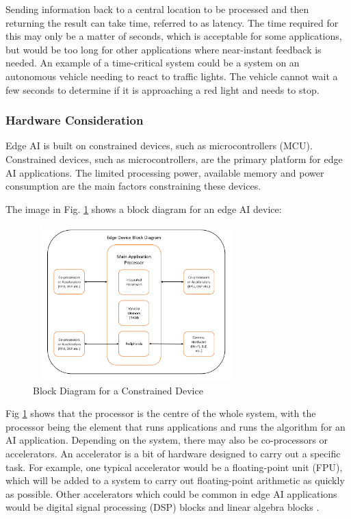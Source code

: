\documentclass[conference]{IEEEtran}
\begin{document}
Sending information back to a central location to be processed and then returning the result can take time, referred to as latency. The time required for this may only be a matter of seconds, which is acceptable for some applications, but would be too long for other applications where near-instant feedback is needed. An example of a time-critical system could be a system on an autonomous vehicle needing to react to traffic lights. The vehicle cannot wait a few seconds to determine if it is approaching a red light and needs to stop. 

\subsubsection{Hardware Consideration}
Edge AI is built on constrained devices, such as microcontrollers (MCU). Constrained devices, such as microcontrollers, are the primary platform for edge AI applications. The limited processing power, available memory and power consumption are the main factors constraining these devices. 

The image in Fig. \ref{fig:ucblock} shows a block diagram for an edge AI device:    
\begin{figure}[h]
\includegraphics[width=8cm, height=6cm]{images/edge_device_block_diagram.png}
\centering
\caption{Block Diagram for a Constrained Device}
\label{fig:ucblock}
\end{figure}

Fig \ref{fig:ucblock} shows that the processor is the centre of the whole system, with the processor being the element that runs applications and runs the algorithm for an AI application. Depending on the system, there may also be co-processors or accelerators. An accelerator is a bit of hardware designed to carry out a specific task. For example, one typical accelerator would be a floating-point unit (FPU), which will be added to a system to carry out floating-point arithmetic as quickly as possible. Other accelerators which could be common in edge AI applications would be digital signal processing (DSP) blocks and linear algebra blocks \cite{edgeAI}. 
\end{document}
